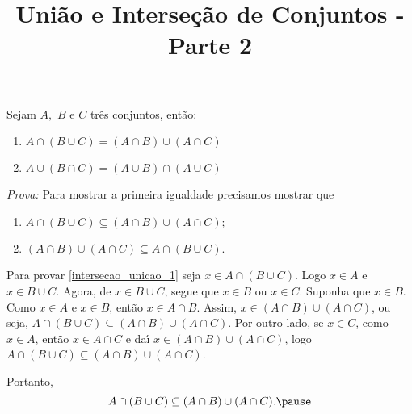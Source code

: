 \documentclass{beamer}
\title{Uni\~ao e Interse\c{c}\~ao de Conjuntos - Parte 2}
\author[\autor]{\autor}
\institute[\instituto]{\instituto}
\date{}
\begin{document}
    \begin{frame}
        \maketitle
    \end{frame}


    \begin{frame}
        \begin{proposicao} Sejam $A,$ $B$ e $C$ tr{\^e}s conjuntos, ent{\~a}o:\pause
            \begin{enumerate}[label={\roman*})]
                \item $A \cap ( B \cup C) = (A \cap B) \cup (A \cap C)$\pause
                \item $A \cup (B \cap C) = (A \cup B) \cap (A \cup C)$\pause
            \end{enumerate}
        \end{proposicao}
        \textit{Prova:} \pause
        Para mostrar a primeira igualdade precisamos mostrar que\pause
        \begin{enumerate}[label=({\arabic*})]
            \item $A \cap (B \cup C) \subseteq (A \cap B) \cup ( A \cap C)$;\label{intersecao_unicao_1}\pause
            \item $(A \cap B) \cup (A \cap C) \subseteq A \cap (B \cup C).$\label{intersecao_unicao_2}\pause
        \end{enumerate}

        Para provar \ref{intersecao_unicao_1} seja $x\in A \cap (B \cup C)$. \pause Logo $x \in A$ \pause e $x \in B \cup C$. \pause Agora, de $x \in B \cup C$, \pause segue que $x \in B$ \pause ou $x \in C$. \pause Suponha que $x \in B$. \pause Como $x \in A$ e $x \in B$, \pause ent\~ao $x \in A \cap B$. \pause Assim, $x \in (A \cap B) \cup (A \cap C)$, \pause ou seja, $A \cap (B \cup C) \subseteq (A \cap B) \cup (A \cap C)$. \pause Por outro lado, se $x \in C$, \pause como $x \in A$, ent{\~a}o $x \in A \cap C$ \pause e da{\'\i} $x \in (A \cap B) \cup (A \cap C)$, \pause logo $A \cap (B \cup C)\subseteq (A \cap B) \cup (A \cap C)$.\pause

        Portanto,
        \[
            A \cap (B \cup C) \subseteq (A \cap B) \cup (A \cap C).\pause
        \]
    \end{frame}
\end{document}
